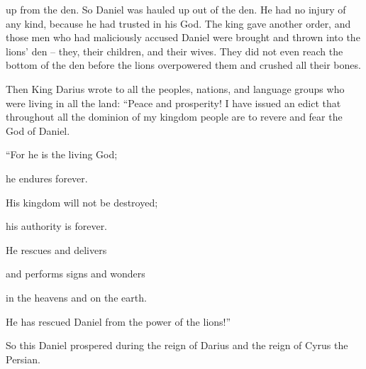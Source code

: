 {up
from
the den.
So Daniel
was hauled up
out of
the den.
He had
no
injury
of any
kind, because
he had trusted
in his God.
The king
gave
another order,
and those
men
who
had maliciously
accused
Daniel
were brought and thrown into
the lions’
den
– they, their children,
and their wives.
They did not
even reach
the bottom
of the den
before
the lions
overpowered
them and crushed
all
their bones.
\par }{\PP {}Then
King
Darius
wrote
to all
the peoples,
nations,
and language groups
who
were living
in all
the land: “Peace
and prosperity!
I
have issued
an edict
that
throughout
all
the dominion
of my kingdom
people are
to revere
and fear
the God
of
Daniel.
\par }{\Q “For
he is
the living
God;
\par }{\Q he endures
forever.
\par }{\Q His kingdom
will not
be destroyed;
\par }{\Q his authority
is forever.
\par }{\Q {}He rescues
and delivers
\par }{\Q and performs
signs
and wonders
\par }{\Q in the heavens
and on the earth.
\par }{\Q He has rescued
Daniel
from
the power
of the lions!”
\par }{\PP {}So this
Daniel
prospered
during the reign
of Darius
and the reign
of Cyrus
the Persian.

}
